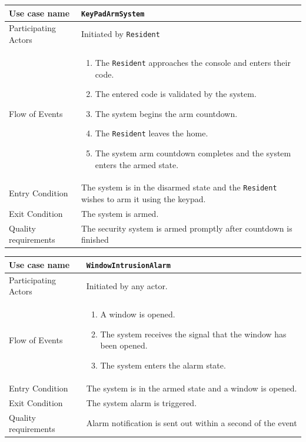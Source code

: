 \documentclass{report}
\begin{document}
\begin{tabular}{| l | p{12cm} |}
\hline
Use case name & \texttt{KeyPadArmSystem} \\ \hline
Participating Actors & Initiated by \texttt{Resident} \\ \hline
Flow of Events & 

\begin{enumerate}
 \item The \texttt{Resident} approaches the console and enters their code.
 \item The entered code is validated by the system.
 \item The system begins the arm countdown.
 \item The \texttt{Resident} leaves the home.
 \item The system arm countdown completes and the system enters the armed state.
\end{enumerate}

\\ \hline

Entry Condition & The system is in the disarmed state and the \texttt{Resident}
    wishes to arm it using the keypad. \\ \hline
Exit Condition & The system is armed. \\ \hline
Quality requirements & The security system is armed promptly after countdown is
finished\\ \hline

\hline
\end{tabular}

\begin{tabular}{| l | p{12cm} |}
\hline
Use case name & \texttt{WindowIntrusionAlarm} \\ \hline
Participating Actors & Initiated by any actor. \\ \hline
Flow of Events & 

\begin{enumerate}
 \item A window is opened.
 \item The system receives the signal that the window has been opened.
 \item The system enters the alarm state.
\end{enumerate}

\\ \hline

Entry Condition & The system is in the armed state and a window is opened. \\ 
\hline
Exit Condition & The system alarm is triggered. \\ \hline
Quality requirements & Alarm notification is sent out within a second of the
event\\ \hline

\hline
\end{tabular}
\end{document}
